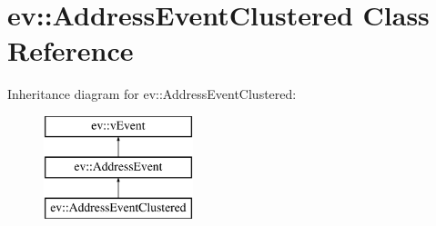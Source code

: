 \hypertarget{classev_1_1AddressEventClustered}{}\section{ev\+:\+:Address\+Event\+Clustered Class Reference}
\label{classev_1_1AddressEventClustered}
Inheritance diagram for ev\+:\+:Address\+Event\+Clustered\+:\begin{figure}[H]
\begin{center}
\leavevmode
\includegraphics[height=3.000000cm]{classev_1_1AddressEventClustered}
\end{center}
\end{figure}
